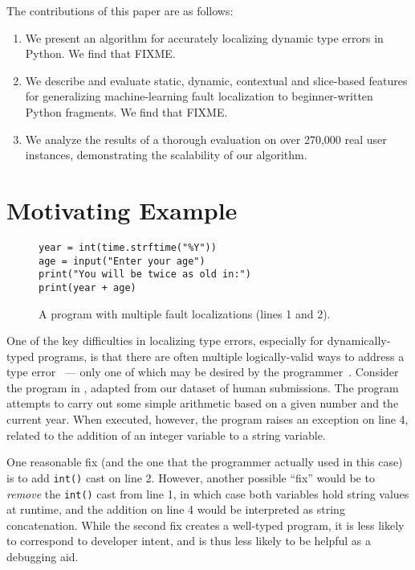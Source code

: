 \documentclass[conference]{IEEEtran}
\newcommand\lt[1]{{\lstinline|#1|}}
\begin{document}
The contributions of this paper are as follows:
\begin{enumerate}

\item We present an algorithm for accurately localizing dynamic type errors
in Python. We find that FIXME. 

\item We describe and evaluate static, dynamic, contextual and slice-based
features for generalizing machine-learning fault localization to
beginner-written Python fragments. We find that FIXME.

\item We analyze the results of a thorough evaluation on over 270,000 real
user instances, demonstrating the scalability of our algorithm. 

\end{enumerate} 

\section{Motivating Example}

\begin{figure}
\begin{lstlisting}
year = int(time.strftime("%Y"))
age = input("Enter your age")
print("You will be twice as old in:")
print(year + age)
\end{lstlisting}
\caption{
\label{fig-motex}
A program with multiple fault localizations (lines 1 and 2).}
\end{figure}

One of the key difficulties in localizing type errors, especially for
dynamically-typed programs, is that there are often multiple
logically-valid ways to address a type error~\cite{FIXME} --- only one of
which may be desired by the programmer~\cite{FIXME}.  Consider the program
in , adapted from our dataset of human submissions. The
program attempts to carry out some simple arithmetic based on a given
number and the current year. When executed, however, the program raises an
exception on line 4, related to the addition of an integer variable to a
string variable.

One reasonable fix (and the one that the programmer actually used in this
case) is to add \lt{int()} cast on line 2. However, another possible
``fix'' would be to \textit{remove} the \lt{int()} cast from line 1, in
which case both variables hold string values at runtime, and the addition
on line 4 would be interpreted as string concatenation. While the second
fix creates a well-typed program, it is less likely to correspond to
developer intent, and is thus less likely to be helpful as a debugging aid.
\end{document}
